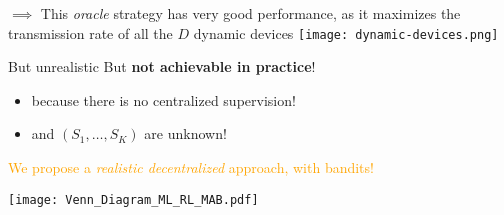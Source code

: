 \begin{frameO}

    \begin{colorblock}{}
        \(\implies\) This \emph{oracle} strategy has very good performance, as it maximizes the transmission rate of all the \(D\) dynamic devices
        \texttt{[image: dynamic-devices.png]}
    \end{colorblock}

    \vspace*{10pt}

    \begin{colorblock}{But unrealistic}
        But \textbf{not achievable in practice}!
        \begin{itemize}
            \item \alert{because there is no centralized supervision!}
            \item and $(S_1,\dots,S_K)$ are unknown!
        \end{itemize}
    \end{colorblock}

    \vspace*{10pt}

        \textcolor{orange}{We propose a \emph{realistic decentralized} approach, with bandits!}
        \begin{center}
            \texttt{[image: Venn\_Diagram\_ML\_RL\_MAB.pdf]}
        \end{center}



\end{frameO}



